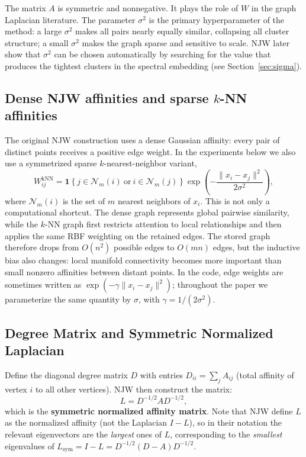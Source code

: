 \documentclass[11pt]{article}
\theoremstyle{plain}
\theoremstyle{definition}
\begin{document}
The matrix $A$ is symmetric and nonnegative. It plays the role of $W$ in the graph Laplacian literature. The parameter $\sigma^2$ is the primary hyperparameter of the method: a large $\sigma^2$ makes all pairs nearly equally similar, collapsing all cluster structure; a small $\sigma^2$ makes the graph sparse and sensitive to scale. NJW later show that $\sigma^2$ can be chosen automatically by searching for the value that produces the tightest clusters in the spectral embedding (see Section~\ref{sec:sigma}).

\subsection{Dense NJW affinities and sparse $k$-NN affinities}
The original NJW construction uses a dense Gaussian affinity: every pair of distinct points receives a positive edge weight. In the experiments below we also use a symmetrized sparse $k$-nearest-neighbor variant,
\[
W_{ij}^{\mathrm{kNN}}=
\mathbf{1}\!\left\{j\in\mathcal{N}_m(i)\ \mathrm{or}\ i\in\mathcal{N}_m(j)\right\}
\exp\!\left(-\frac{\|x_i-x_j\|^2}{2\sigma^2}\right),
\]
where $\mathcal{N}_m(i)$ is the set of $m$ nearest neighbors of $x_i$. This is not only a computational shortcut. The dense graph represents global pairwise similarity, while the $k$-NN graph first restricts attention to local relationships and then applies the same RBF weighting on the retained edges. The stored graph therefore drops from $O(n^2)$ possible edges to $O(mn)$ edges, but the inductive bias also changes: local manifold connectivity becomes more important than small nonzero affinities between distant points. In the code, edge weights are sometimes written as $\exp(-\gamma\|x_i-x_j\|^2)$; throughout the paper we parameterize the same quantity by $\sigma$, with $\gamma=1/(2\sigma^2)$.

\subsection{Degree Matrix and Symmetric Normalized Laplacian}

Define the diagonal degree matrix $D$ with entries $D_{ii} = \sum_j A_{ij}$ (total affinity of vertex $i$ to all other vertices). NJW then construct the matrix:
\begin{equation}
    L = D^{-1/2} A D^{-1/2},
    \label{eq:L_njw}
\end{equation}
which is the \textbf{symmetric normalized affinity matrix}. Note that NJW define $L$ as the normalized affinity (not the Laplacian $I - L$), so in their notation the relevant eigenvectors are the \emph{largest} ones of $L$, corresponding to the \emph{smallest} eigenvalues of $L_{\mathrm{sym}} = I - L = D^{-1/2}(D - A)D^{-1/2}$.
\end{document}
